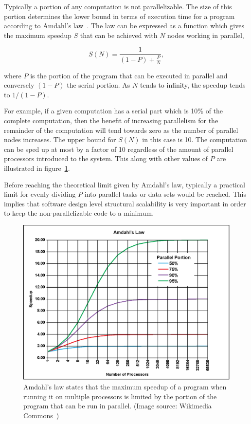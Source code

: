 \documentclass[english]{tktltiki2}
\theoremstyle{definition}
\theoremstyle{remark}
\begin{document}
Typically a portion of any computation is not parallelizable. The size of this
portion determines the lower bound in terms of execution time for a program
according to Amdahl’s law~\cite{amdahlslaw}. The law can be expressed as a
function which gives the maximum speedup $S$ that can be achieved with $N$ nodes
working in parallel,

\begin{equation}
S(N) = \frac{1}{(1-P)+\frac{P}{N}},
\label{eq:amdahlslaw}
\end{equation}

where $P$ is the portion of the program that can be executed in parallel and
conversely $(1-P)$ the serial portion. As $N$ tends to infinity, the speedup
tends to $1/(1-P)$. 


For example, if a given computation has a serial part which is 10\% of the
complete computation, then the benefit of increasing parallelism for the
remainder of the computation will tend towards zero as the number of parallel
nodes increases. The upper bound for $S(N)$ in this case is 10. The computation
can be sped up at most by a factor of 10 regardless of the amount of parallel
processors introduced to the system. This along with other values of $P$ are
illustrated in figure~\ref{fig:amdahlsLaw}. 

Before reaching the theoretical limit given by Amdahl's law, typically a
practical limit for evenly dividing $P$ into parallel tasks or data sets would
be reached. This implies that software design level structural scalability is
very important in order to keep the non-parallelizable code to a minimum.

\begin{figure}[h!]
	\includegraphics[width=\textwidth]{images/AmdahlsLaw}
	\caption{Amdahl's law states that the maximum speedup of a program when running 
	it on multiple processors is limited by the portion of the program that can be 
	run in parallel. (Image source: Wikimedia Commons~\cite{amdahlslawimage})}
	\label{fig:amdahlsLaw}
\end{figure}
\end{document}
